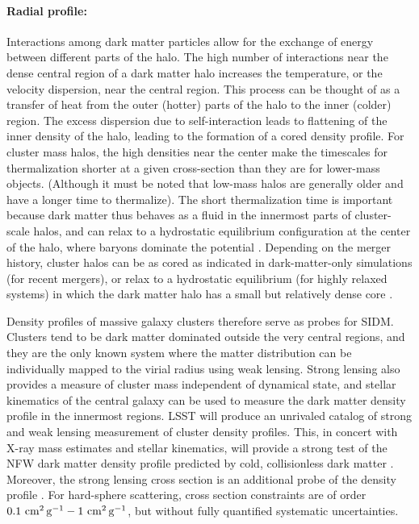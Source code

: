 \paragraph{Radial profile:} Interactions among dark matter particles allow for the exchange of energy between different parts of the halo. The high number of interactions near the dense central region of a dark matter halo increases the temperature, or the velocity dispersion, near the central region. This process can be thought of as a transfer of heat from the outer (hotter) parts of the halo to the inner (colder) region. The excess dispersion due to self-interaction leads to flattening of the inner density of the halo, leading to the formation of a cored density profile. For cluster mass halos, the high densities near the center make the timescales for thermalization shorter at a given cross-section than they are for lower-mass objects. (Although it must be noted that low-mass halos are generally older and have a longer time to thermalize).  The short thermalization time is important because dark matter thus behaves as a fluid in the innermost parts of cluster-scale halos, and can relax to a hydrostatic equilibrium configuration at the center of the halo, where baryons dominate the potential \citep{Kaplinghat:2015aga}.  Depending on the merger history, cluster halos can be as cored as indicated in dark-matter-only simulations (for recent mergers), or relax to a hydrostatic equilibrium (for highly relaxed systems) in which the dark matter halo has a small but relatively dense core \citep{Robertson:2017mgj}.

Density profiles of massive galaxy clusters therefore serve as probes for SIDM. Clusters tend to be dark matter dominated outside the very central regions, and they are the only known system where the matter distribution can be individually mapped to the virial radius using weak lensing. Strong lensing also provides a measure of cluster mass independent of dynamical state, and stellar kinematics of the central galaxy can be used to measure the dark matter density profile in the innermost regions. LSST will produce an unrivaled catalog of strong and weak lensing measurement of cluster density profiles. This, in concert with X-ray mass estimates and stellar kinematics, will provide a strong test of the NFW dark matter density profile predicted by cold, collisionless dark matter \citep{Newman:2013,Kaplinghat:2015aga,Robertson:2018anx,Andrade:2019wzn}. Moreover, the strong lensing cross section is an additional probe of the density profile \citep{Robertson:2018anx}.  For hard-sphere scattering, cross section constraints are of order $0.1\mathrm{\,\mathrm{\,cm}^2\mathrm{\,g}^{-1}}-1\mathrm{\,\mathrm{\,cm}^2\mathrm{\,g}^{-1}}$, but without fully quantified systematic uncertainties.

